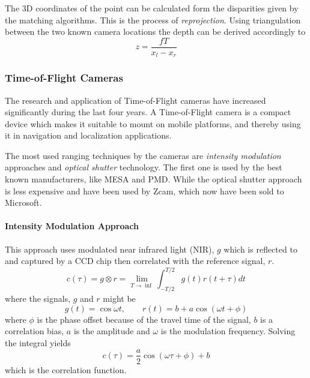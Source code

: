 The 3D coordinates of the point can be calculated form the disparities given by the
matching algorithms. This is the process of \emph{reprojection}. Using triangulation
between the two known camera locations the depth can be derived accordingly to 
\begin{equation}
    z = \frac{f T}{x_l - x_r}
\end{equation}

\subsubsection{Time-of-Flight Cameras}
The research and application of Time-of-Flight cameras have increased significantly during the last four
years. A Time-of-Flight camera is a compact device which makes it suitable to mount on
mobile platforms, and thereby using it in navigation and localization applications. 

The most used ranging techniques by the cameras are \emph{intensity modulation} approaches and
\emph{optical shutter} technology. The first one is used by the best known manufacturers,
like MESA and PMD. While the optical shutter approach is less expensive and have been used
by Zcam, which now have been sold to Microsoft. 


\paragraph{Intensity Modulation Approach}
\label{chap2:subsec-tof}
This approach uses modulated near infrared light (NIR), $g$ which is reflected to and
captured by a CCD chip then correlated with the reference signal, $r$. 
\begin{equation}
    c(\tau) = g \otimes r = \lim_{T \rightarrow \inf} \int^{T/2}_{-T/2} g(t) r(t + \tau) dt
\end{equation}
where the signals, $g$ and $r$ might be
\begin{equation}
    g(t) = \cos{\omega t}, \quad \quad r(t) = b + a \cos{(\omega t + \phi)}
\end{equation}
where $\phi$ is the phase offset because of the travel time of the signal, $b$ is a
correlation bias, $a$ is the amplitude and $\omega$ is the modulation frequency. Solving
the integral yields 
\begin{equation}
    c(\tau) = \frac{a}{2} \cos{(\omega \tau + \phi )} + b
\end{equation}
which is the correlation function. 

